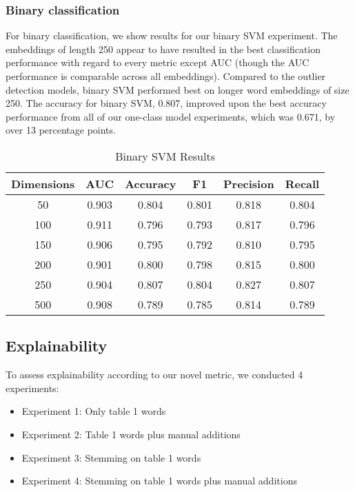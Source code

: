 \documentclass{article}
\begin{document}
\hypertarget{binary-classification}{%
\subsubsection{Binary classification}\label{binary-classification}}

For binary classification, we show results for our binary SVM
experiment. The embeddings of length 250 appear to have resulted in the
best classification performance with regard to every metric except AUC
(though the AUC performance is comparable across all embeddings).
Compared to the outlier detection models, binary SVM performed best on
longer word embeddings of size 250. The accuracy for binary SVM, 0.807,
improved upon the best accuracy performance from all of our one-class
model experiments, which was 0.671, by over 13 percentage points.

\begin{table}
 \caption{Binary SVM Results}
  \centering
  \begin{tabular}{|c|c|c|c|c|c|}
    \hline
    \rowcolor{lightgray} \textbf{Dimensions} & \textbf{AUC} & \textbf{Accuracy} & \textbf{F1} & \textbf{Precision} & \textbf{Recall} \\
    \hline
    50 & 0.903 & 0.804 & 0.801 & 0.818 & 0.804 \\
    \hline
    100 & \cellcolor{green} 0.911 & 0.796 & 0.793 & 0.817 & 0.796 \\
    \hline
    150 & 0.906 & 0.795 & 0.792 & 0.810 & 0.795 \\
    \hline
    200 & 0.901 & 0.800 & 0.798 & 0.815 & 0.800 \\
    \hline
    \cellcolor{green} 250 & 0.904 & \cellcolor{green} 0.807 & \cellcolor{green} 0.804 & \cellcolor{green} 0.827 & \cellcolor{green} 0.807 \\
    \hline
    500 & 0.908 & 0.789 & 0.785 & 0.814 & 0.789 \\
    \hline
  \end{tabular}
  \label{tab:svm}
\end{table}

\hypertarget{explainability}{%
\subsection{Explainability}\label{explainability}}

To assess explainability according to our novel metric, we conducted 4
experiments:

\begin{itemize}
\tightlist
\item
  Experiment 1: Only table 1 words
\item
  Experiment 2: Table 1 words plus manual additions
\item
  Experiment 3: Stemming on table 1 words
\item
  Experiment 4: Stemming on table 1 words plus manual additions
\end{itemize}
\end{document}
